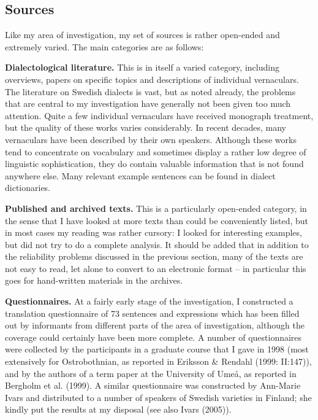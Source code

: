 \subsection[Sources]{\rmfamily Sources}
Like my area of investigation, my set of sources is rather open-ended and extremely varied. The main categories are as follows:

\textbf{Dialectological literature. }This is in itself a varied category, including overviews, papers on specific topics and descriptions of individual vernaculars. The literature on Swedish dialects is vast, but as noted already, the problems that are central to my investigation have generally not been given too much attention. Quite a few individual vernaculars have received monograph treatment, but the quality of these works varies considerably. In recent decades, many vernaculars have been described by their own speakers. Although these works tend to concentrate on vocabulary and sometimes display a rather low degree of linguistic sophistication, they do contain valuable information that is not found anywhere else. Many relevant example sentences can be found in dialect dictionaries. 

\textbf{Published and archived texts.} This is a particularly open-ended category, in the sense that I have looked at more texts than could be conveniently listed, but in most cases my reading was rather cursory: I looked for interesting examples, but did not try to do a complete analysis. It should be added that in addition to the reliability problems discussed in the previous section, many of the texts are not easy to read, let alone to convert to an electronic format – in particular this goes for hand-written materials in the archives. 

\textbf{Questionnaires. }At a fairly early stage of the investigation, I constructed a translation questionnaire of 73 sentences and expressions which has been filled out by informants from different parts of the area of investigation, although the coverage could certainly have been more complete. A number of questionnaires were collected by the participants in a graduate course that I gave in 1998 (most extensively for Ostrobothnian, as reported in Eriksson \& Rendahl (1999: II:147)), and by the authors of a term paper at the University of Umeå, as reported in Bergholm et al. (1999). A similar questionnaire was constructed by Ann-Marie Ivars and distributed to a number of speakers of Swedish varieties in Finland; she kindly put the results at my disposal (see also Ivars (2005)).

